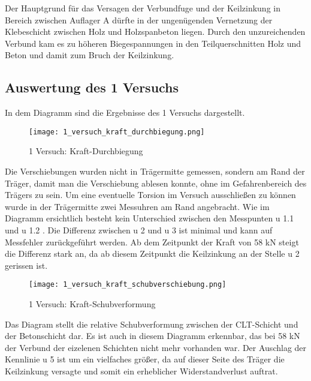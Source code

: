 \documentclass[12 pt,a4 paper ]{scrreprt}
\begin{document}
\clearpage


Der Hauptgrund für das Versagen der Verbundfuge und der Keilzinkung in Bereich zwischen Auflager A dürfte in der ungenügenden Vernetzung der Klebeschicht zwischen Holz und Holzspanbeton liegen. Durch den unzureichenden Verbund kam es zu höheren Biegespannungen in den Teilquerschnitten Holz und Beton und damit zum Bruch der Keilzinkung.
\newline
\subsection{Auswertung des 1 Versuchs}
 In dem Diagramm sind die Ergebnisse des  1 Versuchs dargestellt.




\begin{figure}
\begin{center}
\texttt{[image: 1\_versuch\_kraft\_durchbiegung.png]}
\caption{1 Versuch: Kraft-Durchbiegung}
\label{1 Versuch: Kraft-Durchbiegung}
\end{center}
\end{figure}

Die Verschiebungen wurden nicht in Trägermitte gemessen, sondern am Rand der Träger, damit man die Verschiebung ablesen konnte, ohne im Gefahrenbereich des Trägers zu sein. Um eine eventuelle Torsion im Versuch ausschließen zu können wurde in der Trägermitte zwei Messuhren am Rand angebracht. Wie im Diagramm ersichtlich besteht kein Unterschied zwischen den Messpunten u 1.1 und u 1.2 . Die Differenz zwischen u 2 und u 3 ist minimal und kann auf Messfehler zurückgeführt werden. Ab dem Zeitpunkt der Kraft von 58 kN steigt die Differenz stark an, da ab diesem Zeitpunkt die Keilzinkung an der Stelle u 2 gerissen ist. 


\begin{figure}
\begin{center}
\texttt{[image: 1\_versuch\_kraft\_schubverschiebung.png]}
\caption{1 Versuch: Kraft-Schubverformung}
\label{1_versuch_kraft_schubverschiebung}
\end{center}
\end{figure}

Das Diagram stellt die relative Schubverformung zwischen der CLT-Schicht und der Betonschicht dar. Es ist auch in diesem Diagramm erkennbar, das bei 58 kN der Verbund der eizelenen Schichten nicht mehr vorhanden war. Der Auschlag der Kennlinie u 5 ist um ein vielfaches größer, da auf dieser Seite des Träger die Keilzinkung versagte und somit ein erheblicher Widerstandverlust auftrat.
\clearpage{}
\end{document}
